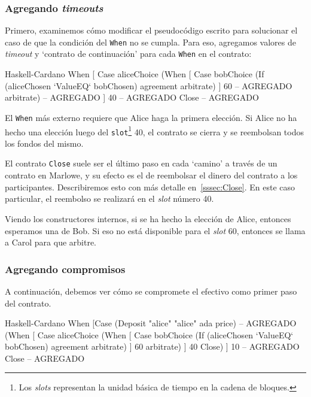\documentclass[12pt]{book}
\begin{document}
\subsubsection{Agregando \textit{timeouts}}

Primero, examinemos cómo modificar el pseudocódigo escrito para solucionar el caso de que la condición del \texttt{When} no se cumpla. Para eso, agregamos valores de \textit{timeout} y `contrato de continuación' para cada \texttt{When} en el contrato:

\begin{code}[title=Pseudocódigo con timeouts.]{Haskell-Cardano}
When [ Case aliceChoice
            (When [ Case bobChoice
                        (If (aliceChosen `ValueEQ` bobChosen)
                           agreement
                           arbitrate) ]
                  60            -- AGREGADO
                  arbitrate)    -- AGREGADO
      ]
      40                        -- AGREGADO
      Close                     -- AGREGADO
\end{code}

El \texttt{When} más externo requiere que Alice haga la primera elección. Si Alice no ha hecho una elección luego del \texttt{slot}\footnote{Los \textit{slots} representan la unidad básica de tiempo en la cadena de bloques.} 40, el contrato se cierra y se reembolsan todos los fondos del mismo.

El contrato \texttt{Close} suele ser el último paso en cada `camino' a través de un contrato en Marlowe, y su efecto es el de reembolsar el dinero del contrato a los participantes. Describiremos esto con más detalle en~\ref{sssec:Close}. En este caso particular, el reembolso se realizará en el \textit{slot} número 40.

Viendo los constructores internos, si se ha hecho la elección de Alice, entonces esperamos una de Bob. Si eso no está disponible para el \textit{slot} 60, entonces se llama a Carol para que arbitre. 


\subsubsection{Agregando compromisos}

A continuación, debemos ver cómo se compromete el efectivo como primer paso del contrato.

\newpage
\begin{code}[title=Pseudocódigo con validación de fondos.]{Haskell-Cardano}
When [Case (Deposit "alice" "alice" ada price)   -- AGREGADO
 (When [ Case aliceChoice
             (When [ Case bobChoice
                         (If (aliceChosen `ValueEQ` bobChosen)
                            agreement
                            arbitrate) ]
                   60
                   arbitrate)
       ]
       40
       Close)
   ]
   10       -- AGREGADO
   Close    -- AGREGADO
\end{code}
\end{document}
